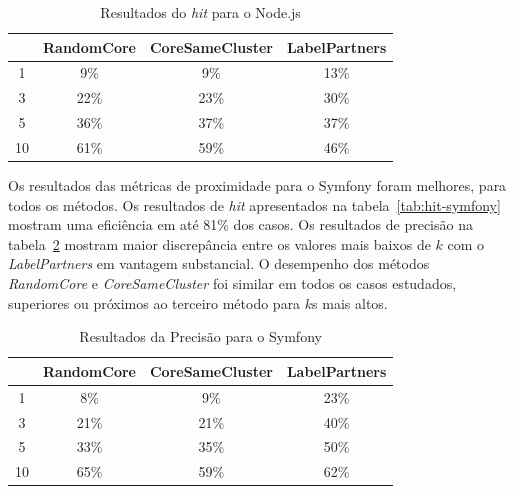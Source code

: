 \documentclass[12pt,openany,oneside,a4paper,english,brazil]{abntbibufjf}
\begin{document}
  \begin{table}[htbp]
  \caption{Resultados do \textit{hit} para o Node.js}
  \begin{center}
  \begin{tabular}{|c|c|c|c|}
  \hline
  \textbf{} & \textbf{RandomCore} & \textbf{CoreSameCluster}& \textbf{LabelPartners} \\
  \hline
  1   & 9\%     & 9\%          & 13\%       \\
  3   & 22\%    & 23\%         & 30\%       \\
  5   & 36\%    & 37\%         & 37\%       \\
  10  & 61\%    & 59\%         & 46\%       \\
  \hline
  \end{tabular}
  \label{tab:hit-node}
  \end{center}
  \end{table}

Os resultados das métricas de proximidade para o Symfony foram melhores, para todos os métodos. Os resultados de \textit{hit} apresentados na tabela~\ref{tab:hit-symfony} mostram uma eficiência em até 81\% dos casos. Os resultados de precisão na tabela~\ref{tab:precision-symfony} mostram maior discrepância entre os valores mais baixos de $k$ com o \textit{LabelPartners} em vantagem substancial. O desempenho dos métodos \textit{RandomCore} e \textit{CoreSameCluster} foi similar em todos os casos estudados, superiores ou próximos ao terceiro método para $k$s mais altos.

  \begin{table}[htbp]
  \caption{Resultados da Precisão para o Symfony}
  \begin{center}
  \begin{tabular}{|c|c|c|c|}
  \hline
  \textbf{} & \textbf{RandomCore} & \textbf{CoreSameCluster}& \textbf{LabelPartners} \\
  \hline
    1  & 8\%        & 9\%             & 23\%          \\
    3  & 21\%       & 21\%            & 40\%          \\
    5  & 33\%       & 35\%            & 50\%          \\
    10 & 65\%       & 59\%            & 62\%         \\
  \hline
  \end{tabular}
  \label{tab:precision-symfony}
  \end{center}
  \end{table}
\end{document}
